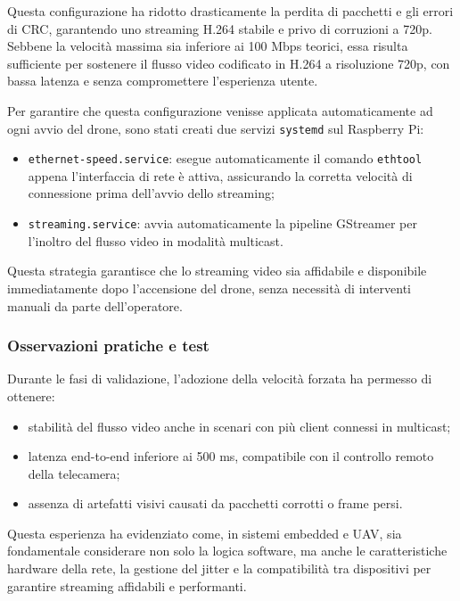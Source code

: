 Questa configurazione ha ridotto drasticamente la perdita di pacchetti e gli errori di CRC, garantendo uno streaming H.264 stabile e privo di corruzioni a 720p.  
Sebbene la velocità massima sia inferiore ai 100 Mbps teorici, essa risulta sufficiente per sostenere il flusso video codificato in H.264 a risoluzione 720p, con bassa latenza e senza compromettere l’esperienza utente.



Per garantire che questa configurazione venisse applicata automaticamente ad ogni avvio del drone, sono stati creati due servizi \texttt{systemd} sul Raspberry Pi:

\begin{itemize}
    \item \texttt{ethernet-speed.service}: esegue automaticamente il comando \texttt{ethtool} appena l’interfaccia di rete è attiva, assicurando la corretta velocità di connessione prima dell’avvio dello streaming;
    \item \texttt{streaming.service}: avvia automaticamente la pipeline GStreamer per l’inoltro del flusso video in modalità multicast.
\end{itemize}

Questa strategia garantisce che lo streaming video sia affidabile e disponibile immediatamente dopo l’accensione del drone, senza necessità di interventi manuali da parte dell’operatore.

\subsubsection{Osservazioni pratiche e test}

Durante le fasi di validazione, l’adozione della velocità forzata ha permesso di ottenere:  

\begin{itemize}
    \item stabilità del flusso video anche in scenari con più client connessi in multicast;
    \item latenza end-to-end inferiore ai 500 ms, compatibile con il controllo remoto della telecamera;
    \item assenza di artefatti visivi causati da pacchetti corrotti o frame persi.
\end{itemize}

Questa esperienza ha evidenziato come, in sistemi embedded e UAV, sia fondamentale considerare non solo la logica software, ma anche le caratteristiche hardware della rete, la gestione del jitter e la compatibilità tra dispositivi per garantire streaming affidabili e performanti.

